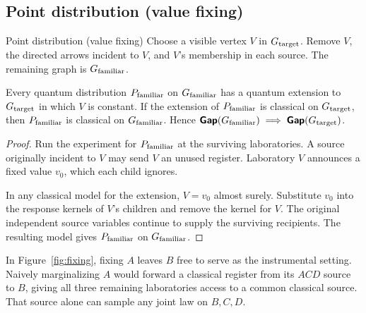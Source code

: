 \subsection{Point distribution (value fixing)}\label{sec:fixing}
\begin{piggyback}{Point distribution (value fixing)}
Choose a visible vertex \(V\) in \(G_{\text{target}}\). Remove \(V\), the directed
arrows incident to \(V\), and \(V\)'s membership in each source. The
remaining graph is \(G_{\text{familiar}}\).
\end{piggyback}
\begin{proposition}\label{prop:fixing}
Every quantum distribution \(P_{\text{familiar}}\) on \(G_{\text{familiar}}\) has a quantum
extension to \(G_{\text{target}}\) in which \(V\) is constant. If the extension of
\(P_{\text{familiar}}\) is classical on \(G_{\text{target}}\), then \(P_{\text{familiar}}\) is classical
on \(G_{\text{familiar}}\). Hence \(\operatorname{\text{\normalfont\sffamily\bfseries Gap}}(G_{\text{familiar}})\implies\operatorname{\text{\normalfont\sffamily\bfseries Gap}}(G_{\text{target}})\).
\end{proposition}
\begin{proof}
Run the experiment for \(P_{\text{familiar}}\) at the surviving laboratories. A
source originally incident to \(V\) may send \(V\) an unused register.
Laboratory \(V\) announces a fixed value \(v_0\), which each child ignores.

In any classical model for the extension, \(V=v_0\) almost surely.
Substitute \(v_0\) into the response kernels of \(V\)'s children and remove
the kernel for \(V\). The original independent source variables continue to supply the surviving
recipients. The resulting model gives
\(P_{\text{familiar}}\) on \(G_{\text{familiar}}\).
\end{proof}
In Figure~\ref{fig:fixing}, fixing \(A\) leaves \(B\) free to serve as
the instrumental setting. Naively marginalizing \(A\) would forward a classical
register from its \(ACD\) source to \(B\), giving all three remaining
laboratories access to a common classical source. That source alone can
sample any joint law on \(B,C,D\).

